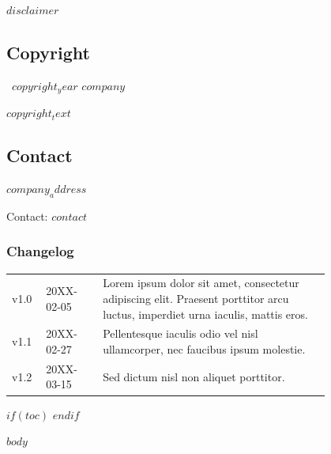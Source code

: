 \documentclass[
	a4paper,
	12pt,
]{$document_class$}
\begin{document}
$disclaimer$

\subsection*{Copyright}

\textcopyright~$copyright_year$ $company$

$copyright_text$

\subsection*{Contact}

$company_address$

Contact: $contact$

\vfill %

\subsubsection*{Changelog}

\scriptsize %

\begin{tabular}{@{} L{0.05\linewidth} L{0.15\linewidth} L{0.6\linewidth} @{}} %
	\toprule
	v1.0 & 20XX-02-05 & Lorem ipsum dolor sit amet, consectetur adipiscing elit. Praesent porttitor arcu luctus, imperdiet urna iaculis, mattis eros.\\
	v1.1 & 20XX-02-27 & Pellentesque iaculis odio vel nisl ullamcorper, nec faucibus ipsum molestie.\\
	v1.2 & 20XX-03-15 & Sed dictum nisl non aliquet porttitor.\\
	\bottomrule
\end{tabular}

\newpage

$if(toc)$
	\tableofcontents %
\newpage
$endif$

\begin{fullwidth} %
$body$
\end{fullwidth}
\end{document}
